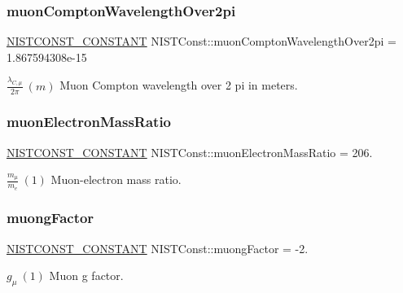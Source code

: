 \subsubsection{\texorpdfstring{muon\+Compton\+Wavelength\+Over2pi}{muonComptonWavelengthOver2pi}}
{\footnotesize\ttfamily \mbox{\hyperlink{group___n_i_s_t_const-_macros_ga2b0fc1d7452373f816175dd86ce26729}{N\+I\+S\+T\+C\+O\+N\+S\+T\+\_\+\+C\+O\+N\+S\+T\+A\+NT}} N\+I\+S\+T\+Const\+::muon\+Compton\+Wavelength\+Over2pi = 1.\+867594308e-\/15}

$\frac{\lambda_{C,\mu}}{2\pi} \ (m)$ Muon Compton wavelength over 2 pi in meters. \mbox{\label{group___n_i_s_t_const-_muon_ga66653799cefd4fb005dabc4be673ad74}} 
\subsubsection{\texorpdfstring{muon\+Electron\+Mass\+Ratio}{muonElectronMassRatio}}
{\footnotesize\ttfamily \mbox{\hyperlink{group___n_i_s_t_const-_macros_ga2b0fc1d7452373f816175dd86ce26729}{N\+I\+S\+T\+C\+O\+N\+S\+T\+\_\+\+C\+O\+N\+S\+T\+A\+NT}} N\+I\+S\+T\+Const\+::muon\+Electron\+Mass\+Ratio = 206.}

$\frac{m_\mu}{m_e} \ (1)$ Muon-\/electron mass ratio. \mbox{\label{group___n_i_s_t_const-_muon_ga2b85305eb64cc099a63d6637b573630d}} 
\subsubsection{\texorpdfstring{muong\+Factor}{muongFactor}}
{\footnotesize\ttfamily \mbox{\hyperlink{group___n_i_s_t_const-_macros_ga2b0fc1d7452373f816175dd86ce26729}{N\+I\+S\+T\+C\+O\+N\+S\+T\+\_\+\+C\+O\+N\+S\+T\+A\+NT}} N\+I\+S\+T\+Const\+::muong\+Factor = -\/2.}

$g_\mu \ (1)$ Muon g factor. \mbox{\label{group___n_i_s_t_const-_muon_gac11cf134e94f91150434d6a03a615586}} 
